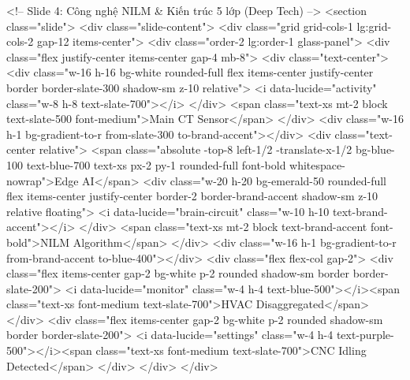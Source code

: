         <!-- Slide 4: Công nghệ NILM & Kiến trúc 5 lớp (Deep Tech) -->
        <section class="slide">
            <div class="slide-content">
                <div class="grid grid-cols-1 lg:grid-cols-2 gap-12 items-center">
                    <div class="order-2 lg:order-1 glass-panel">
                        <div class="flex justify-center items-center gap-4 mb-8">
                            <div class="text-center">
                                <div class="w-16 h-16 bg-white rounded-full flex items-center justify-center border border-slate-300 shadow-sm z-10 relative">
                                    <i data-lucide="activity" class="w-8 h-8 text-slate-700"></i>
                                </div>
                                <span class="text-xs mt-2 block text-slate-500 font-medium">Main CT Sensor</span>
                            </div>
                            <div class="w-16 h-1 bg-gradient-to-r from-slate-300 to-brand-accent"></div>
                            <div class="text-center relative">
                                <span class="absolute -top-8 left-1/2 -translate-x-1/2 bg-blue-100 text-blue-700 text-xs px-2 py-1 rounded-full font-bold whitespace-nowrap">Edge AI</span>
                                <div class="w-20 h-20 bg-emerald-50 rounded-full flex items-center justify-center border-2 border-brand-accent shadow-sm z-10 relative floating">
                                    <i data-lucide="brain-circuit" class="w-10 h-10 text-brand-accent"></i>
                                </div>
                                <span class="text-xs mt-2 block text-brand-accent font-bold">NILM Algorithm</span>
                            </div>
                            <div class="w-16 h-1 bg-gradient-to-r from-brand-accent to-blue-400"></div>
                            <div class="flex flex-col gap-2">
                                <div class="flex items-center gap-2 bg-white p-2 rounded shadow-sm border border-slate-200">
                                    <i data-lucide="monitor" class="w-4 h-4 text-blue-500"></i><span class="text-xs font-medium text-slate-700">HVAC Disaggregated</span>
                                </div>
                                <div class="flex items-center gap-2 bg-white p-2 rounded shadow-sm border border-slate-200">
                                    <i data-lucide="settings" class="w-4 h-4 text-purple-500"></i><span class="text-xs font-medium text-slate-700">CNC Idling Detected</span>
                                </div>
                            </div>
                        </div>
